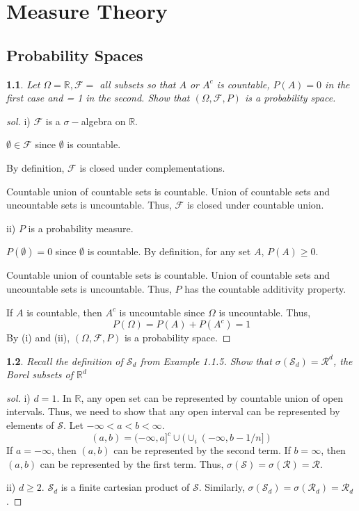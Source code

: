 \documentclass{report}
\newtheorem{ex}{}[section]
\newcommand\frontmatter{%
    \clearpage
  \pagenumbering{roman}}
\newcommand\mainmatter{%
    \clearpage
  \pagenumbering{arabic}}
\begin{document}
\frontmatter

\mainmatter

\chapter{Measure Theory}
\section{Probability Spaces}
\begin{ex}
Let $\Omega = \mathbb{R}, \mathcal{F} =$ all subsets so that $A$ or $A^c$ is countable, $P(A) = 0$ in the first case and = 1 in the second. Show that $(\Omega, \mathcal{F}, P)$ is a probability space.
\end{ex}
\begin{proof}[sol]
i) $\mathcal{F}$ is a $\sigma-$algebra on $\mathbb{R}$.

$\emptyset \in \mathcal{F}$ since $\emptyset$ is countable.

By definition, $\mathcal{F}$ is closed under complementations.

Countable union of countable sets is countable.  Union of countable sets and uncountable sets is uncountable. Thus, $\mathcal{F}$ is closed under countable union. 

ii) $P$ is a probability measure.

$P(\emptyset) = 0$ since $\emptyset$ is countable. By definition, for any set $A$, $P(A) \ge 0$.

Countable union of countable sets is countable.  Union of countable sets and uncountable sets is uncountable. Thus, $P$ has the countable additivity property. 

If $A$ is countable, then $A^c$ is uncountable since $\Omega$ is uncountable. Thus,
\[P(\Omega) = P(A) + P(A^c) = 1\]
By (i) and (ii), $(\Omega, \mathcal{F}, P)$ is a probability space.
\end{proof}
\begin{ex}
Recall the definition of $\mathcal{S}_d$ from Example 1.1.5. Show that $\sigma (\mathcal{S}_d) =\mathcal{R}^d$, the Borel subsets of $\mathbb{R}^d$
\end{ex}
\begin{proof}[sol]
i) $d = 1$. In $\mathbb{R}$, any open set can be represented by countable union of open intervals. Thus, we need to show that any open interval can be represented by elements of $\mathcal{S}$. Let $-\infty < a <  b < \infty$.
\[(a,b) = (-\infty, a]^c \cup (\cup_i(-\infty, b - 1/n])\]
If $a = -\infty$, then $(a,b)$ can be represented by the second term. If $b =  \infty$, then $(a,b)$ can be represented by the first term. Thus, $\sigma(\mathcal{S}) = \sigma(\mathcal{R}) = \mathcal{R}$.

ii) $d \ge 2$. $\mathcal{S}_d$ is a finite cartesian product of $\mathcal{S}$. Similarly, $\sigma(\mathcal{S}_d) = \sigma(\mathcal{R}_d) = \mathcal{R}_d$.
\end{proof}
\end{document}
